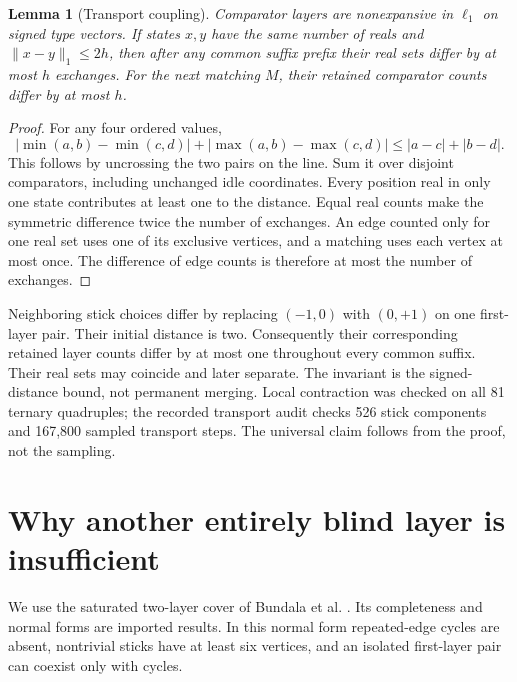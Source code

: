 \documentclass[11pt]{article}
\newtheorem{lemma}[theorem]{Lemma}
\begin{document}
\begin{lemma}[Transport coupling]\label{lem:coupling}
Comparator layers are nonexpansive in $\ell_1$ on signed type vectors. If states $x,y$ have the same number of reals and $\|x-y\|_1\le2h$, then after any common suffix prefix their real sets differ by at most $h$ exchanges. For the next matching $M$, their retained comparator counts differ by at most $h$.
\end{lemma}
\begin{proof}
For any four ordered values,
\[
|\min(a,b)-\min(c,d)|+|\max(a,b)-\max(c,d)|
\le |a-c|+|b-d|.
\]
This follows by uncrossing the two pairs on the line. Sum it over disjoint comparators, including unchanged idle coordinates. Every position real in only one state contributes at least one to the distance. Equal real counts make the symmetric difference twice the number of exchanges. An edge counted only for one real set uses one of its exclusive vertices, and a matching uses each vertex at most once. The difference of edge counts is therefore at most the number of exchanges.
\end{proof}

Neighboring stick choices differ by replacing $(-1,0)$ with $(0,+1)$ on one first-layer pair. Their initial distance is two. Consequently their corresponding retained layer counts differ by at most one throughout every common suffix. Their real sets may coincide and later separate. The invariant is the signed-distance bound, not permanent merging. Local contraction was checked on all 81 ternary quadruples; the recorded transport audit checks 526 stick components and 167,800 sampled transport steps. The universal claim follows from the proof, not the sampling.

\section{Why another entirely blind layer is insufficient}\label{sec:blindbarrier}
We use the saturated two-layer cover of Bundala et al. \cite{bundala}. Its completeness and normal forms are imported results. In this normal form repeated-edge cycles are absent, nontrivial sticks have at least six vertices, and an isolated first-layer pair can coexist only with cycles.
\end{document}
